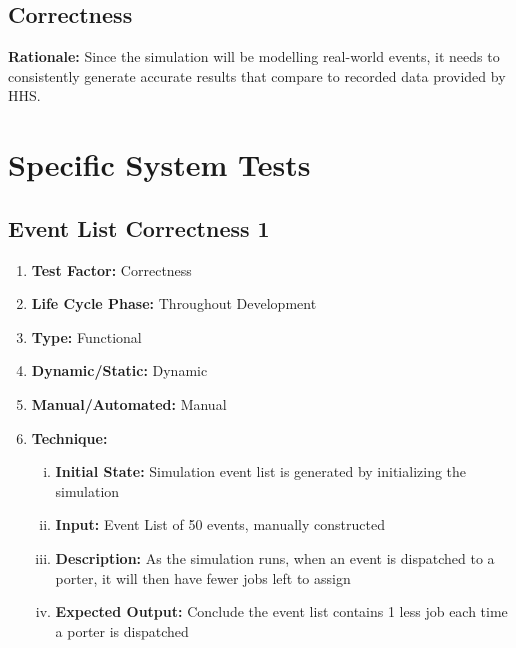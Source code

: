 \documentclass[paper=letter, fontsize=10pt]{scrartcl}
\numberwithin{equation}{section}		%
\numberwithin{figure}{section}			%
\numberwithin{table}{section}				%
\begin{document}
\subsection{Correctness}
\textbf{Rationale:} Since the simulation will be modelling real-world events, it needs to consistently generate accurate results that compare to recorded data provided by HHS.  

\section{Specific System Tests}
\subsection{Event List Correctness 1}
\begin{enumerate}[]
	\item \textbf{Test Factor:} Correctness
	\item \textbf{Life Cycle Phase:} Throughout Development
	\item \textbf{Type:} Functional
	\item \textbf{Dynamic/Static:} Dynamic
	\item \textbf{Manual/Automated:} Manual
	\item \textbf{Technique:} 
		\begin{enumerate}[(i)]
			\item \textbf{Initial State:} Simulation event list is generated by initializing the simulation			
			\item \textbf{Input:} Event List of 50 events, manually constructed
			\item \textbf{Description:} As the simulation runs, when an event is dispatched to a porter, it will then have fewer jobs left to assign
			\item \textbf{Expected Output:} Conclude the event list contains 1 less job each time a porter is dispatched
		\end{enumerate}
\end{enumerate}
\end{document}
